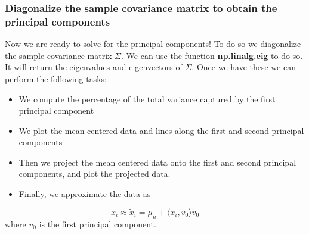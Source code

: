 \documentclass{beamer}
\begin{document}
\begin{frame}
\frametitle{Diagonalize the sample covariance matrix to obtain the principal components}

Now we are ready to solve for the principal components! To do so we
diagonalize the sample covariance matrix $\Sigma$. We can use the
function \textbf{np.linalg.eig} to do so. It will return the eigenvalues and
eigenvectors of $\Sigma$. Once we have these we can perform the 
following tasks:

\begin{itemize}
\item We compute the percentage of the total variance captured by the first principal component

\item We plot the mean centered data and lines along the first and second principal components

\item Then we project the mean centered data onto the first and second principal components, and plot the projected data. 

\item Finally, we approximate the data as
\end{itemize}

\noindent
\begin{equation*}
x_i \approx \tilde{x}_i = \mu_n + \langle x_i, v_0 \rangle v_0
\end{equation*}
where $v_0$ is the first principal component.
\end{frame}
\end{document}
